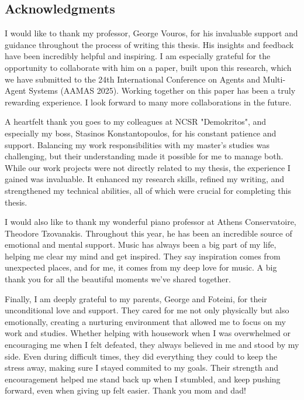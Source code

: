 \subsection*{Acknowledgments}

\begin{flushleft}
    I would like to thank my professor, George Vouros, for his invaluable support and guidance throughout the process of writing this thesis. His insights and feedback have been incredibly helpful and inspiring. I am especially grateful for the opportunity to collaborate with him on a paper, built upon this research, which we have submitted to the 24th International Conference on Agents and Multi-Agent Systems (AAMAS 2025). Working together on this paper has been a truly rewarding experience. I look forward to many more collaborations in the future.
\end{flushleft}

\begin{flushleft}
    A heartfelt thank you goes to my colleagues at NCSR "Demokritos", and especially my boss, Stasinos Konstantopoulos, for his constant patience and support. Balancing my work responsibilities with my master’s studies was challenging, but their understanding made it possible for me to manage both. While our work projects were not directly related to my thesis, the experience I gained was invaluable. It enhanced my research skills, refined my writing, and strengthened my technical abilities, all of which were crucial for completing this thesis.
\end{flushleft}

\begin{flushleft}
    I would also like to thank my wonderful piano professor at Athens Conservatoire, Theodore Tzovanakis. Throughout this year, he has been an incredible source of emotional and mental support. Music has always been a big part of my life, helping me clear my mind and get inspired. They say inspiration comes from unexpected places, and for me, it comes from my deep love for music. A big thank you for all the beautiful moments we've shared together.
\end{flushleft}

\begin{flushleft}
    Finally, I am deeply grateful to my parents, George and Foteini, for their unconditional love and support. They cared for me not only physically but also emotionally, creating a nurturing environment that allowed me to focus on my work and studies. Whether helping with housework when I was overwhelmed or encouraging me when I felt defeated, they always believed in me and stood by my side. Even during difficult times, they did everything they could to keep the stress away, making sure I stayed commited to my goals. Their strength and encouragement helped me stand back up when I stumbled, and keep pushing forward, even when giving up felt easier. Thank you mom and dad!
\end{flushleft}

